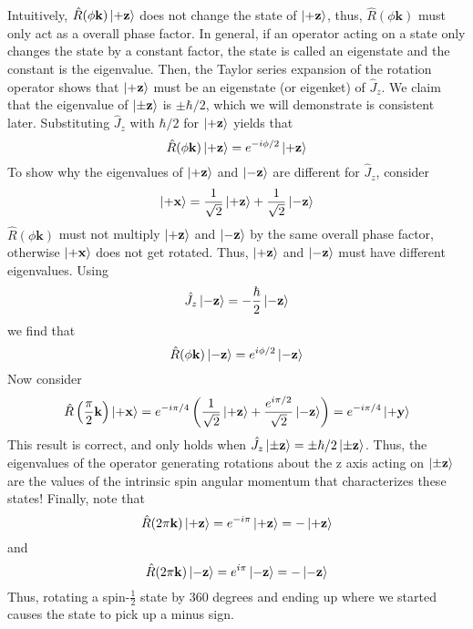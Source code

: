\documentclass{report}
\begin{document}
Intuitively, \(\hat R(\phi \mathbf k) \ket{+ \mathbf z}\) does not change the state of \(\ket{+ \mathbf z}\), thus, \(\hat R(\phi \mathbf k)\) must only act as a overall phase factor. In general, if an operator acting on a state only changes the state by a constant factor, the state is called an eigenstate and the constant is the eigenvalue. Then, the Taylor series expansion of the rotation operator shows that \(\ket{+ \mathbf z}\) must be an eigenstate (or eigenket) of \(\hat J_z\). We claim that the eigenvalue of \(\ket{\pm \mathbf z}\) is \(\pm \hbar / 2\), which we will demonstrate is consistent later. Substituting \(\hat J_z\) with \(\hbar/2\) for \(\ket{+ \mathbf z}\) yields that 
\[
\hat R(\phi \mathbf k) \ket{+ \mathbf z} = e^{-i \phi /2} \ket{+ \mathbf z}
\] 
To show why the eigenvalues of \(\ket{+ \mathbf z}\) and \(\ket{- \mathbf z}\) are different for \(\hat J_z\), consider 
\[\ket{+ \mathbf x} = \frac{1}{\sqrt 2} \ket{+ \mathbf z} + \frac{1}{\sqrt 2} \ket{- \mathbf z}\]
\(\hat R (\phi \mathbf k)\) must not multiply \(\ket{+ \mathbf z}\) and \(\ket{- \mathbf z}\) by the same overall phase factor, otherwise \(\ket{+ \mathbf x}\) does not get rotated. Thus, \(\ket{+ \mathbf z}\) and \(\ket{- \mathbf z}\) must have different eigenvalues. Using 
\[
\hat J_z \ket{- \mathbf z} = - \frac{\hbar}{2} \ket{- \mathbf z}
\] 
we find that
\[
\hat R(\phi \mathbf k) \ket{- \mathbf z} = e^{i \phi / 2}\ket{- \mathbf z}
\] 
Now consider
\[
\hat R \left(\frac{\pi}{2} \mathbf k \right) \ket{+ \mathbf x} = e^{-i\pi/4} \left( \frac{1}{\sqrt 2} \ket{+ \mathbf z} + \frac{e^{i \pi/2}}{\sqrt 2} \ket{- \mathbf z} \right) = e^{-i \pi / 4} \ket{+ \mathbf y}
\] 
This result is correct, and only holds when \(\hat J_z \ket{\pm \mathbf z} = \pm \hbar / 2 \ket{\pm \mathbf z}\). Thus, the eigenvalues of the operator generating rotations about the z axis acting on \(\ket{\pm \mathbf z}\) are the values of the intrinsic spin angular momentum that characterizes these states! Finally, note that
\[
\hat R(2 \pi \mathbf k) \ket{+ \mathbf z} = e^{-i\pi} \ket{+ \mathbf z} = - \ket{+ \mathbf z} 
\]
and
\[
\hat R(2 \pi \mathbf k) \ket{- \mathbf z} = e^{i\pi} \ket{- \mathbf z} = - \ket{- \mathbf z} 
\]
Thus, rotating a spin-\(\frac{1}{2}\) state by 360 degrees and ending up where we started causes the state to pick up a minus sign. 
\end{document}

